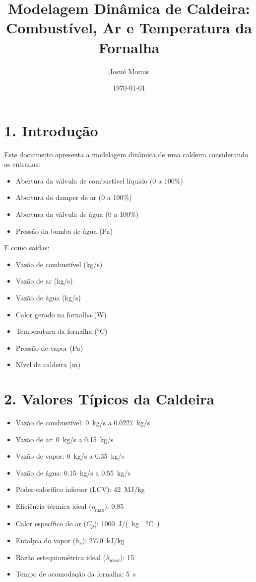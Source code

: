 \documentclass[12pt]{article}
\title{Modelagem Din\^amica de Caldeira: Combust\'ivel, Ar e Temperatura da Fornalha}
\author{Josu\'e Morais}
\date{\today}
\begin{document}
\maketitle

\section*{1. Introdu\c{c}\~ao}
Este documento apresenta a modelagem din\^amica de uma caldeira considerando as entradas:
\begin{itemize}
    \item Abertura da v\'alvula de combust\'ivel l\'iquido (0 a 100\%)
    \item Abertura do damper de ar (0 a 100\%)
    \item Abertura da v\'alvula de \'agua (0 a 100\%)
    \item Press\~ao da bomba de \'agua (Pa)
\end{itemize}
E como sa\'idas:
\begin{itemize}
    \item Vaz\~ao de combust\'ivel (kg/s)
    \item Vaz\~ao de ar (kg/s)
    \item Vaz\~ao de \'agua (kg/s)
    \item Calor gerado na fornalha (W)
    \item Temperatura da fornalha (\si{\celsius})
    \item Press\~ao de vapor (Pa)
    \item N\'ivel da caldeira (m)
\end{itemize}

\section*{2. Valores T\'ipicos da Caldeira}
\begin{itemize}
    \item Vaz\~ao de combust\'ivel: \SI{0}{kg/s} a \SI{0.0227}{kg/s}
    \item Vaz\~ao de ar: \SI{0}{kg/s} a \SI{0.15}{kg/s}
    \item Vaz\~ao de vapor: \SI{0}{kg/s} a \SI{0.35}{kg/s}
    \item Vaz\~ao de \'agua: \SI{0.15}{kg/s} a \SI{0.55}{kg/s}
    \item Poder calor\'ifico inferior (LCV): \SI{42}{MJ/kg}
    \item Efici\^encia t\'ermica ideal (\(\eta_{\text{max}}\)): 0,85
    \item Calor espec\'ifico do ar (\(C_p\)): \SI{1000}{J/(kg\cdot\celsius)}
    \item Entalpia do vapor (\(h_v\)): \SI{2770}{kJ/kg}
    \item Raz\~ao estequiom\'etrica ideal (\(\lambda_{\text{ideal}}\)): 15
    \item Tempo de acomoda\c{c}\~ao da fornalha: \SI{5}{s}
\end{itemize}
\end{document}
